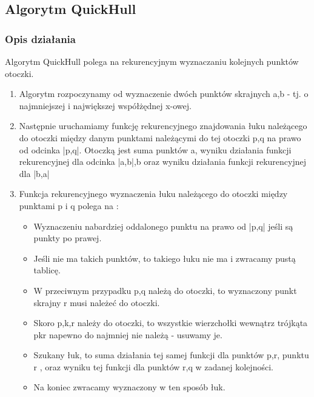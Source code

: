 \documentclass[11pt]{article}
\theoremstyle{remark} \newtheorem{definition}{def.}
\theoremstyle{definition} \newtheorem{twierdzenie}{tw.}
\begin{document}
\subsection{Algorytm QuickHull}
    \subsubsection{Opis działania}
    Algorytm QuickHull polega na rekurencyjnym wyznaczaniu kolejnych punktów otoczki. 
    \begin{enumerate}
        \item   Algorytm rozpoczynamy od wyznaczenie dwóch punktów skrajnych a,b - tj. o najmniejszej
                i największej współżędnej x-owej.
        \item   Następnie uruchamiamy funkcję rekurencyjnego znajdowania łuku należącego do otoczki
                między danym punktami należącymi do tej otoczki p,q  na prawo od odcinka |p,q|.
                Otoczką jest suma punktów a, wyniku działania funkcji rekurencyjnej dla odcinka |a,b|,b
                oraz wyniku działania funkcji rekurencyjnej dla |b,a|
        \item   Funkcja rekurencyjnego wyznaczenia łuku należącego do otoczki między punktami p i q polega na :
                \begin{itemize}
                    \item   Wyznaczeniu nabardziej oddalonego punktu na prawo od |p,q| jeśli są punkty po prawej.
                    \item   Jeśli nie ma takich punktów, to takiego łuku nie ma i zwracamy pustą tablicę. 
                    \item   W przeciwnym przypadku p,q należą do otoczki, to wyznaczony punkt skrajny r 
                            musi należeć do otoczki. 
                    \item   Skoro p,k,r należy do otoczki, to wszystkie wierzchołki wewnątrz trójkąta pkr napewno do najmniej
                            nie należą - usuwamy je.
                    \item   Szukany łuk, to suma działania tej samej funkcji dla punktów p,r, punktu r , oraz
                            wyniku tej funkcji dla punktów r,q w zadanej kolejności.
                    \item   Na koniec zwracamy wyznaczony w ten sposób łuk.
                \end{itemize}
    \end{enumerate}
\end{document}
